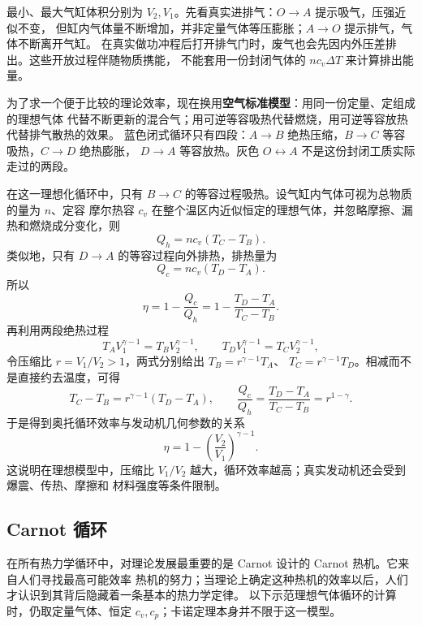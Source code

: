 \ottoCycleFigure
{}

最小、最大气缸体积分别为 $V_2,V_1$。先看真实进排气：$O\to A$ 提示吸气，压强近似不变，
但缸内气体量不断增加，并非定量气体等压膨胀；$A\to O$ 提示排气，气体不断离开气缸。
在真实做功冲程后打开排气门时，废气也会先因内外压差排出。这些开放过程伴随物质携能，
不能套用一份封闭气体的 $nc_v\Delta T$ 来计算排出能量。

为了求一个便于比较的理论效率，现在换用\textbf{空气标准模型}：用同一份定量、定组成的理想气体
代替不断更新的混合气；用可逆等容吸热代替燃烧，用可逆等容放热代替排气散热的效果。
蓝色闭式循环只有四段：$A\to B$ 绝热压缩，$B\to C$ 等容吸热，$C\to D$ 绝热膨胀，
$D\to A$ 等容放热。灰色 $O\leftrightarrow A$ 不是这份封闭工质实际走过的两段。

在这一理想化循环中，只有 $B\to C$ 的等容过程吸热。设气缸内气体可视为总物质的量为 $n$、定容
摩尔热容 $c_v$ 在整个温区内近似恒定的理想气体，并忽略摩擦、漏热和燃烧成分变化，则
\[
  Q_h=n c_v(T_C-T_B).
\]
类似地，只有 $D\to A$ 的等容过程向外排热，排热量为
\[
  Q_c=n c_v(T_D-T_A).
\]
所以
\[
  \eta=1-\frac{Q_c}{Q_h}
  =1-\frac{T_D-T_A}{T_C-T_B}.
\]
再利用两段绝热过程
\[
  T_A V_1^{\gamma-1}=T_B V_2^{\gamma-1},
  \qquad
  T_D V_1^{\gamma-1}=T_C V_2^{\gamma-1},
\]
令压缩比 $r=V_1/V_2>1$，两式分别给出 $T_B=r^{\gamma-1}T_A$、
$T_C=r^{\gamma-1}T_D$。相减而不是直接约去温度，可得
\[
 T_C-T_B=r^{\gamma-1}(T_D-T_A),\qquad
 \frac{Q_c}{Q_h}=\frac{T_D-T_A}{T_C-T_B}=r^{1-\gamma}.
\]
于是得到奥托循环效率与发动机几何参数的关系
\begin{equation}
  \boxed{\eta=1-\left(\frac{V_2}{V_1}\right)^{\gamma-1}}.
\end{equation}
这说明在理想模型中，压缩比 $V_1/V_2$ 越大，循环效率越高；真实发动机还会受到爆震、传热、摩擦和
材料强度等条件限制。

\subsection*{Carnot 循环}

在所有热力学循环中，对理论发展最重要的是 Carnot 设计的 Carnot 热机。它来自人们寻找最高可能效率
热机的努力；当理论上确定这种热机的效率以后，人们才认识到其背后隐藏着一条基本的热力学定律。
以下示范理想气体循环的计算时，仍取定量气体、恒定 $c_v,c_p$；卡诺定理本身并不限于这一模型。

\carnotCycleFigure
{}

